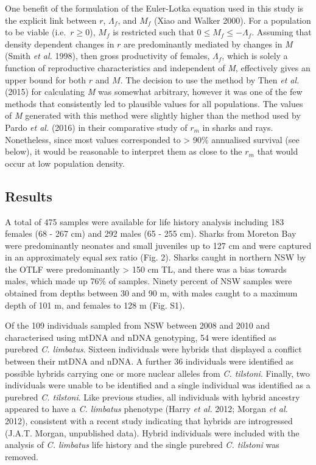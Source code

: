 \documentclass[]{article}
\begin{document}
One benefit of the formulation of the Euler-Lotka equation used in this
study is the explicit link between \(r\), \(\Lambda_f\), and \(M_f\)
(Xiao and Walker 2000). For a population to be viable
(i.e.~\(r \geq 0\)), \(M_f\) is restricted such that
\(0 \leq M_f \leq -\Lambda_f\). Assuming that density dependent changes
in \(r\) are predominantly mediated by changes in \emph{M} (Smith
\emph{et al.} 1998), then gross productivity of females, \(\Lambda_f\),
which is solely a function of reproductive characteristics and
independent of \emph{M}, effectively gives an upper bound for both \(r\)
and \(M\). The decision to use the method by Then \emph{et al.} (2015)
for calculating \emph{M} was somewhat arbitrary, however it was one of
the few methods that consistently led to plausible values for all
populations. The values of \emph{M} generated with this method were
slightly higher than the method used by Pardo \emph{et al.} (2016) in
their comparative study of \(r_m\) in sharks and rays. Nonetheless,
since most values corresponded to \textgreater{} 90\% annualised
survival (see below), it would be reasonable to interpret them as close
to the \(r_m\) that would occur at low population density.

\hypertarget{results}{%
\subsection{Results}\label{results}}

A total of 475 samples were available for life history analysis
including 183 females (68 - 267 cm) and 292 males (65 - 255 cm). Sharks
from Moreton Bay were predominantly neonates and small juveniles up to
127 cm and were captured in an approximately equal sex ratio (Fig. 2).
Sharks caught in northern NSW by the OTLF were predominantly
\textgreater{} 150 cm TL, and there was a bias towards males, which made
up 76\% of samples. Ninety percent of NSW samples were obtained from
depths between 30 and 90 m, with males caught to a maximum depth of 101
m, and females to 128 m (Fig. S1).

Of the 109 individuals sampled from NSW between 2008 and 2010 and
characterised using mtDNA and nDNA genotyping, 54 were identified as
purebred \emph{C. limbatus}. Sixteen individuals were hybrids that
displayed a conflict between their mtDNA and nDNA. A further 36
individuals were identified as possible hybrids carrying one or more
nuclear alleles from \emph{C. tilstoni}. Finally, two individuals were
unable to be identified and a single individual was identified as a
purebred \emph{C. tilstoni}. Like previous studies, all individuals with
hybrid ancestry appeared to have a \emph{C. limbatus} phenotype (Harry
\emph{et al.} 2012; Morgan \emph{et al.} 2012), consistent with a recent
study indicating that hybrids are introgressed (J.A.T. Morgan,
unpublished data). Hybrid individuals were included with the analysis of
\emph{C. limbatus} life history and the single purebred \emph{C.
tilstoni} was removed.
\end{document}

